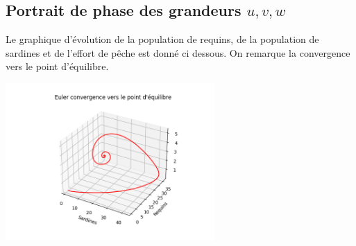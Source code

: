 \documentclass[a4paper, 11pt]{report}%
\begin{document}
        \subsection{Portrait de phase des grandeurs $u,v,w$}
        Le graphique d'évolution de la population de requins, de la population de sardines et de l'effort de pêche est donné ci dessous.
        On remarque la convergence vers le point d'équilibre.
        \begin{center}
            \includegraphics[width=8cm]{figures/convergence_3d_point_equilibre.png}
        \end{center}
        
\end{document}
